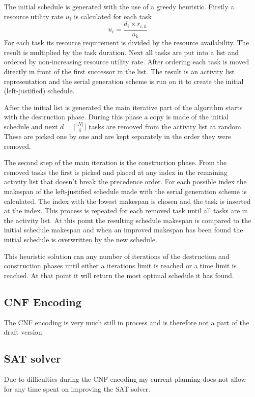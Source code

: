 The initial schedule is generated with the use of a greedy heuristic. Firstly a resource utility rate \(u_i\) is calculated for each task 
\begin{equation}
u_i=\frac{d_i \times r_{i,k}}{a_k} 
\end{equation}
For each task its resource requirement is divided by the resource availability. The result is multiplied by the task duration. Next all tasks are put into a list and ordered by non-increasing resource utility rate. After ordering each task is moved directly in front of the first successor in the list. The result is an activity list representation and the serial generation scheme is run on it to create the initial (left-justified) schedule.

After the initial list is generated the main iterative part of the algorithm starts with the destruction phase. During this phase a copy is made of the initial schedule and next \(d=\lceil\frac{|N|}{4}\rceil\)  tasks are removed from the activity list at random. These are picked one by one and are kept separately in the order they were removed.

The second step of the main iteration is the construction phase. From the removed tasks the first is picked and placed at any index in the remaining activity list that doesn't break the precedence order. For each possible index the makespan of the left-justified schedule made with the serial generation scheme is calculated. The index with the lowest makespan is chosen and the task is inserted at the index. This process is repeated for each removed task until all tasks are in the activity list. At this point the resulting schedule makespan is compared to the initial schedule makespan and when an improved makespan has been found the initial schedule is overwritten by the new schedule.

This heuristic solution can any number of iterations of the destruction and construction phases until either a iterations limit is reached or a time limit is reached. At that point it will return the most optimal schedule it has found.


\subsection{CNF Encoding}
The CNF encoding is very much still in process and is therefore not a part of the draft version.


\subsection{SAT solver}
Due to difficulties during the CNF encoding my current planning does not allow for any time spent on improving the SAT solver.